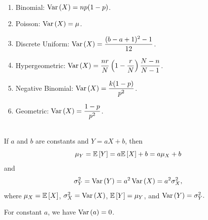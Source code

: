 \begin{definition}
    \phantom{}\
    \begin{enumerate}
        \item Binomial: $\operatorname{Var}\left({X}\right) = np(1-p)$.
        \item Poisson: $\operatorname{Var}\left({X}\right) = \mu$.
        \item Discrete Uniform: $\operatorname{Var}\left({X}\right) = \displaystyle \frac{(b-a+1)^2 - 1}{12}$.
        \item Hypergeometric: $\operatorname{Var}\left({X}\right) = \displaystyle \frac{nr}{N} \left( 1 - \frac{r}{N} \right) \frac{N-n}{N-1}$.
        \item Negative Binomial: $\operatorname{Var}\left({X}\right) = \displaystyle \frac{k(1-p)}{p^2}$.
        \item Geometric: $\operatorname{Var}\left({X}\right) = \displaystyle \frac{1-p}{p^2}$.
    \end{enumerate}
\end{definition}

\begin{theorem}
    \phantom{}  \\
    If $a$ and $b$ are constants and $Y = aX + b$, then
    \[\mu_Y = \mathbb{E}\left[{Y}\right] = a\mathbb{E}\left[{X}\right] + b = a\mu_X + b\] and
    \[\sigma_Y^2 = \operatorname{Var}\left({Y}\right) = a^2\operatorname{Var}\left({X}\right) = a^2\sigma_X^2,\]
    where $\mu_X = \mathbb{E}\left[{X}\right]$, $\sigma_X^2 = \operatorname{Var}\left({X}\right)$, $\mathbb{E}\left[{Y}\right] = \mu_Y$, and $\operatorname{Var}\left({Y}\right) = \sigma_Y^2.$
\end{theorem}

\begin{note}
    For constant $a$, we have $\operatorname{Var}\left({a}\right) = 0$.
\end{note}




\newpage